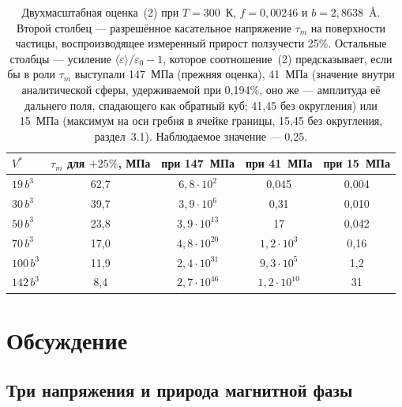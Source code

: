 \begin{table}[!htbp]
\centering
\caption{Двухмасштабная оценка~(2) при $T = 300$~К, $f = 0{,}00246$ и
$b = 2{,}8638$~\AA{}. Второй столбец --- разрешённое касательное напряжение
$\tau_m$ на поверхности частицы, воспроизводящее измеренный прирост
ползучести 25\%. Остальные столбцы --- усиление
$\langle\dot\varepsilon\rangle/\dot\varepsilon_0 - 1$, которое
соотношение~(2) предсказывает, если бы в роли $\tau_m$ выступали 147~МПа
(прежняя оценка), 41~МПа (значение внутри аналитической сферы, удерживаемой при 0{,}194\%,
оно же --- амплитуда её дальнего поля, спадающего как обратный куб; 41{,}45
без округления) или 15~МПа (максимум на оси гребня в
ячейке границы, 15{,}45 без округления, раздел~3.1). Наблюдаемое значение --- 0{,}25.}
\label{tab:bridge}
\begin{tabular}{lcccc}
\hline
$V^{*}$ & $\tau_m$ для $+25\%$, МПа & при 147~МПа & при 41~МПа & при 15~МПа \\
\hline
$19\,b^{3}$  & 62{,}7 & $6{,}8\cdot10^{2}$  & 0{,}045 & 0{,}004 \\
$30\,b^{3}$  & 39{,}7 & $3{,}9\cdot10^{6}$  & 0{,}31 & 0{,}010 \\
$50\,b^{3}$  & 23{,}8 & $3{,}9\cdot10^{13}$ & 17 & 0{,}042 \\
$70\,b^{3}$  & 17{,}0 & $4{,}8\cdot10^{20}$ & $1{,}2\cdot10^{3}$ & 0{,}16 \\
$100\,b^{3}$ & 11{,}9 & $2{,}4\cdot10^{31}$ & $9{,}3\cdot10^{5}$ & 1{,}2 \\
$142\,b^{3}$ & 8{,}4  & $2{,}7\cdot10^{46}$ & $1{,}2\cdot10^{10}$ & 31 \\
\hline
\end{tabular}
\end{table}

\section{Обсуждение}

\subsection{Три напряжения и природа магнитной фазы}

